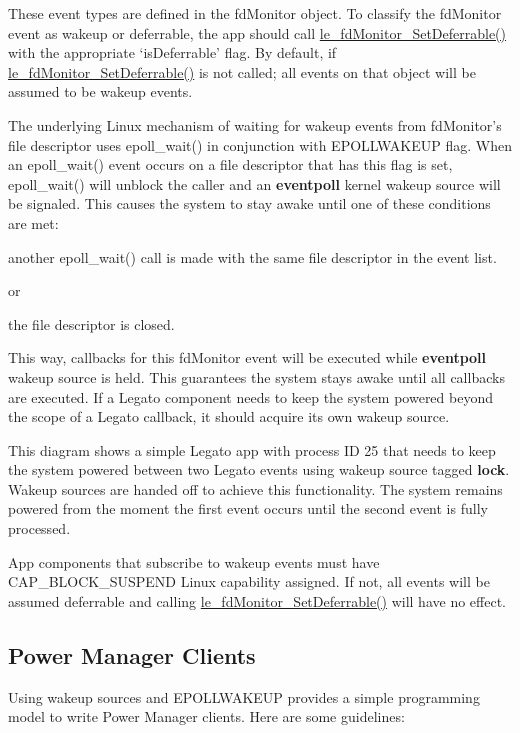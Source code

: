 These event types are defined in the {\ttfamily fd\+Monitor} object. To classify the fd\+Monitor event as wakeup or deferrable, the app should call \hyperlink{le__fd_monitor_8h_a66a93ae01f1e6faf1d0c7645752d4442}{le\+\_\+fd\+Monitor\+\_\+\+Set\+Deferrable()} with the appropriate ‘is\+Deferrable’ flag. By default, if \hyperlink{le__fd_monitor_8h_a66a93ae01f1e6faf1d0c7645752d4442}{le\+\_\+fd\+Monitor\+\_\+\+Set\+Deferrable()} is not called; all events on that object will be assumed to be wakeup events.

The underlying Linux mechanism of waiting for wakeup events from {\ttfamily fd\+Monitor’s} file descriptor uses epoll\+\_\+wait() in conjunction with {\ttfamily E\+P\+O\+L\+L\+W\+A\+K\+E\+U\+P} flag. When an epoll\+\_\+wait() event occurs on a file descriptor that has this flag is set, epoll\+\_\+wait() will unblock the caller and an {\bfseries eventpoll} kernel wakeup source will be signaled. This causes the system to stay awake until one of these conditions are met\+:


\begin{DoxyItemize}
\item another epoll\+\_\+wait() call is made with the same file descriptor in the event list.
\end{DoxyItemize}

or


\begin{DoxyItemize}
\item the file descriptor is closed.
\end{DoxyItemize}

This way, callbacks for this {\ttfamily fd\+Monitor} event will be executed while {\bfseries eventpoll} wakeup source is held. This guarantees the system stays awake until all callbacks are executed. If a Legato component needs to keep the system powered beyond the scope of a Legato callback, it should acquire its own wakeup source.

This diagram shows a simple Legato app with process I\+D 25 that needs to keep the system powered between two Legato events using wakeup source tagged {\bfseries lock}. Wakeup sources are handed off to achieve this functionality. The system remains powered from the moment the first event occurs until the second event is fully processed.



App components that subscribe to wakeup events must have C\+A\+P\+\_\+\+B\+L\+O\+C\+K\+\_\+\+S\+U\+S\+P\+E\+N\+D Linux capability assigned. If not, all events will be assumed deferrable and calling \hyperlink{le__fd_monitor_8h_a66a93ae01f1e6faf1d0c7645752d4442}{le\+\_\+fd\+Monitor\+\_\+\+Set\+Deferrable()} will have no effect.\hypertarget{how_to_power_mgmt_howToPowerMgmt_clients}{}\subsection{Power Manager Clients}\label{how_to_power_mgmt_howToPowerMgmt_clients}
Using wakeup sources and E\+P\+O\+L\+L\+W\+A\+K\+E\+U\+P provides a simple programming model to write Power Manager clients. Here are some guidelines\+:


